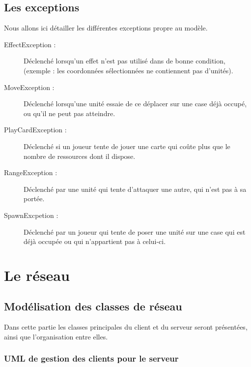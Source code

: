 \documentclass[a4paper,11pt]{report}
\begin{document}
      \section{Les exceptions}
        Nous allons ici détailler les différentes exceptions propre au modèle.
        \begin{description}
          \item[EffectException : ]Déclenché lorsqu’un effet n’est pas utilisé dans de bonne condition, (exemple : les coordonnées sélectionnées ne contiennent pas d’unités).
          \item[MoveException : ]Déclenché lorsqu'une unité essaie de ce déplacer sur une case déjà occupé, ou qu'il ne peut pas atteindre.
          \item[PlayCardException : ]Déclenché si un joueur tente de jouer une carte qui coûte plus que le nombre de ressources dont il dispose.
          \item[RangeException : ]Déclenché par une unité qui tente d'attaquer une autre, qui n'est pas à sa portée.
          \item[SpawnExcpetion :]Déclenché par un joueur qui tente de poser une unité sur une case qui est déjà occupée ou qui n'appartient pas à celui-ci.
        \end{description}
        




\chapter{Le réseau}

\section{Modélisation des classes de réseau}
Dans cette partie les classes principales du client et du serveur seront présentées, ainsi que l'organisation entre elles.
\subsection{UML de gestion des clients pour le serveur}
\end{document}
